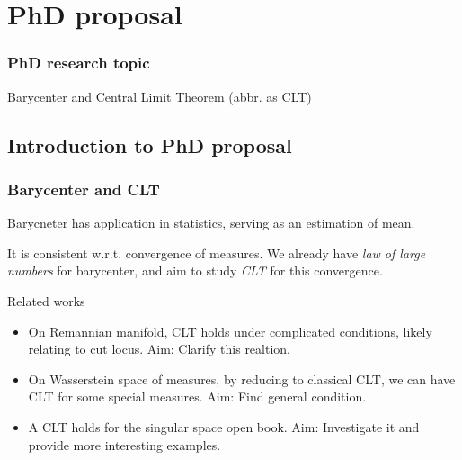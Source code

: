 \documentclass[aspectratio=169]{beamer}
\begin{document}
\section{PhD proposal}
\begin{frame}
	\frametitle{PhD research topic}
	Barycenter and Central Limit Theorem (abbr. as CLT)
\end{frame}

\subsection{Introduction to PhD proposal}
\begin{frame}
	\frametitle{Barycenter and CLT}
	Barycneter has application in statistics, serving as an estimation of mean.

	It is consistent w.r.t. convergence of measures. We already have \textit{law of large numbers} for barycenter, and aim to study \textit{CLT} for this convergence. \pause
	\begin{block}{Related works}
		\begin{itemize}
			\item On Remannian manifold, CLT holds under complicated conditions, likely relating to cut locus. Aim: \alert{Clarify this realtion}. \pause
			\item On Wasserstein space of measures, by reducing to classical CLT, we can have CLT for some special measures. Aim: \alert{Find general condition}. \pause
			\item A CLT holds for the singular space open book. Aim: \alert{Investigate it and provide more interesting examples}.
		\end{itemize}
	\end{block}
\end{frame}
\end{document}
